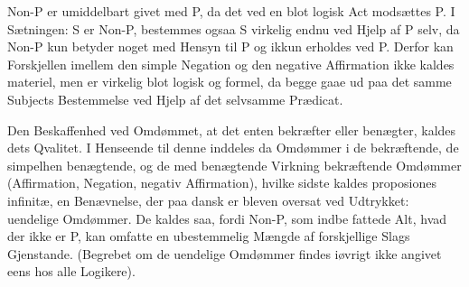 \documentclass[12pt]{book}
\def\textit#1{#1}%
\def\emph#1{#1}%
\newcommand{\opage}[1]{\marginnote{\footnotesize\textit{[#1]}}}
\begin{document}
\textit{Non-P} er umiddelbart givet med \textit{P}, da det ved en blot logisk Act
modsættes \textit{P}. I Sætningen: \textit{S} er \textit{Non-P}, bestemmes ogsaa \textit{S}
virkelig endnu ved Hjelp af \textit{P} selv, da \textit{Non-P} kun betyder noget med Hensyn
til \textit{P} og ikkun erholdes ved \textit{P}. Derfor kan Forskjellen imellem den simple
Negation og den negative \emph{Affirmation} ikke kaldes materiel, men er virkelig blot
logisk og formel, da begge gaae ud paa det samme Subjects Bestemmelse ved Hjelp af det
selvsamme Prædicat.

Den Beskaffenhed ved Omdømmet, at det enten bekræfter eller benægter, kaldes dets
\textit{Qvalitet}. I Henseende til denne inddeles da Omdømmer i de bekræftende, de
simpelhen benægtende, og de med benægtende \emph{Virkning} bekræftende Omdømmer
(\emph{Affirmation}, \emph{Negation}, negativ \emph{Affirmation}), hvilke sidste kaldes
\textit{proposiones infinitæ}, en Benævnelse, der paa dansk er bleven oversat ved
Udtrykket: uendelige Omdømmer. De kaldes saa, fordi \textit{Non-P}, som indbe%
\opage{273}fattede Alt, hvad der ikke er \textit{P}, kan omfatte en ubestemmelig Mængde af
forskjellige Slags Gjenstande. (Begrebet om de uendelige Omdømmer findes iøvrigt ikke
angivet eens hos alle Logikere).
\end{document}
